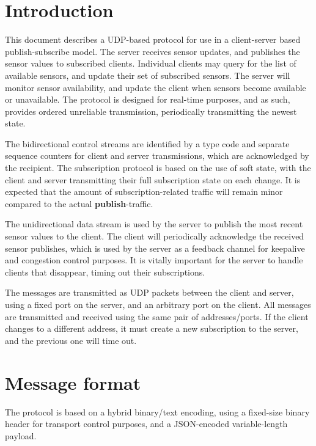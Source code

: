 \documentclass[a4paper]{article}
\begin{document}


\tableofcontents
\newpage

\section{Introduction}
This document describes a UDP-based protocol for use in a client-server based publish-subscribe model.
The server receives sensor updates, and publishes the sensor values to subscribed clients.
Individual clients may query for the list of available sensors, and update their set of subscribed sensors.
The server will monitor sensor availability, and update the client when sensors become available or unavailable.
The protocol is designed for real-time purposes, and as such, provides ordered unreliable transmission, periodically transmitting the newest state.

The bidirectional control streams are identified by a type code and separate sequence counters for client and server transmissions, which are acknowledged by the recipient.
The subscription protocol is based on the use of soft state, with the client and server transmitting their full subscription state on each change.
It is expected that the amount of subscription-related traffic will remain minor compared to the actual \textbf{publish}-traffic.

The unidirectional data stream is used by the server to publish the most recent sensor values to the client.
The client will periodically acknowledge the received sensor publishes, which is used by the server as a feedback channel for keepalive and congestion control purposes.
It is vitally important for the server to handle clients that disappear, timing out their subscriptions.

The messages are transmitted as UDP packets between the client and server, using a fixed port on the server, and an arbitrary port on the client.
All messages are transmitted and received using the same pair of \- addresses/ports.
If the client changes to a different address, it must create a new subscription to the server, and the previous one will time out.

\section{Message format}
The protocol is based on a hybrid binary/text encoding, using a fixed-size binary header for transport control purposes, and a JSON-encoded variable-length payload.
\end{document}
